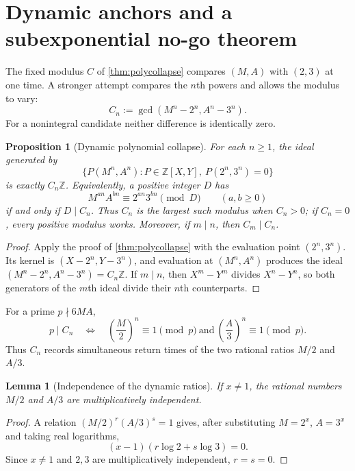 \documentclass[11pt]{article}
\newtheorem{proposition}[theorem]{Proposition}
\newtheorem{lemma}[theorem]{Lemma}
\theoremstyle{definition}
\theoremstyle{remark}
\newcommand{\Z}{\mathbb{Z}}
\begin{document}
\section{Dynamic anchors and a subexponential no-go theorem}
\label{sec:dynamic}

The fixed modulus $C$ of \cref{thm:polycollapse} compares $(M,A)$ with $(2,3)$ at one time.
A stronger attempt compares the $n$th powers and allows the modulus to vary:
\[
       C_n:=\gcd(M^n-2^n,A^n-3^n).
       \tag{8.1}\label{eq:Cn}
\]
For a nonintegral candidate neither difference is identically zero.

\begin{proposition}[Dynamic polynomial collapse]\label{prop:dynamiccollapse}
For each $n\ge1$, the ideal generated by
\[
       \{P(M^n,A^n):P\in\Z[X,Y],\ P(2^n,3^n)=0\}
\]
is exactly $C_n\Z$.  Equivalently, a positive integer $D$ has
\[
       M^{an}A^{bn}\equiv2^{an}3^{bn}\pmod D
       \qquad(a,b\ge0)
\]
if and only if $D\mid C_n$.  Thus $C_n$ is the largest such modulus when $C_n>0$; if
$C_n=0$, every positive modulus works.
Moreover, if $m\mid n$, then $C_m\mid C_n$.
\end{proposition}
\begin{proof}
Apply the proof of \cref{thm:polycollapse} with the evaluation point
$(2^n,3^n)$.  Its kernel is $(X-2^n,Y-3^n)$, and evaluation at $(M^n,A^n)$ produces the
ideal $(M^n-2^n,A^n-3^n)=C_n\Z$.  If $m\mid n$, then
$X^m-Y^m$ divides $X^n-Y^n$, so both generators of the $m$th ideal divide their
$n$th counterparts.
\end{proof}

For a prime $p\nmid6MA$,
\[
 p\mid C_n
 \quad\Longleftrightarrow\quad
 \left(\frac M2\right)^n\equiv1\pmod p
 \ \text{and}\ 
 \left(\frac A3\right)^n\equiv1\pmod p.
 \tag{8.2}\label{eq:Cnorders}
\]
Thus $C_n$ records simultaneous return times of the two rational ratios $M/2$ and $A/3$.

\begin{lemma}[Independence of the dynamic ratios]\label{lem:ratioind}
If $x\ne1$, the rational numbers $M/2$ and $A/3$ are multiplicatively independent.
\end{lemma}
\begin{proof}
A relation $(M/2)^r(A/3)^s=1$ gives, after substituting $M=2^x$, $A=3^x$ and taking
real logarithms,
\[
       (x-1)(r\log2+s\log3)=0.
\]
Since $x\ne1$ and $2,3$ are multiplicatively independent, $r=s=0$.
\end{proof}
\end{document}
